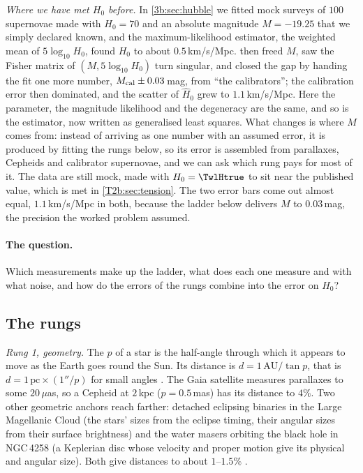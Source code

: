 \emph{Where we have met $H_0$ before.} In \cref{3b:sec:hubble} we fitted mock surveys of $100$ supernovae made with $H_0=70$ and an absolute magnitude $M=-19.25$ that we simply declared known, and the maximum-likelihood estimator, the weighted mean of $5\log_{10}H_0$, found $H_0$ to about $0.5$\,km/s/Mpc.  then freed $M$, saw the Fisher matrix of $(M,5\log_{10}H_0)$ turn singular, and closed the gap by handing the fit one more number, $M_{\rm cal}\pm0.03$\,mag, from ``the calibrators''; the calibration error then dominated, and the scatter of $\hat H_0$ grew to $1.1$\,km/s/Mpc. Here the parameter, the magnitude likelihood and the degeneracy are the same, and so is the estimator, now written as generalised least squares. What changes is where $M$ comes from: instead of arriving as one number with an assumed error, it is produced by fitting the rungs below, so its error is assembled from parallaxes, Cepheids and calibrator supernovae, and we can ask which rung pays for most of it. The data are still mock, made with $H_0=\TwlHtrue$ to sit near the published value, which is met in \cref{T2b:sec:tension}. The two error bars come out almost equal, $1.1$\,km/s/Mpc in both, because the ladder below delivers $M$ to $0.03$\,mag, the precision the worked problem assumed.

\paragraph{The question.} Which measurements make up the ladder, what does each one measure and with what noise, and how do the errors of the rungs combine into the error on $H_0$?

\subsection{The rungs}

\emph{Rung 1, geometry.} The  $p$ of a star is the half-angle through which it appears to move as the Earth goes round the Sun. Its distance is $d=1\,\mathrm{AU}/\tan p$, that is $d=1\,\mathrm{pc}\times(1''/p)$ for small angles \cite[Sec.~8]{Hogg1999}. The Gaia satellite measures parallaxes to some $20\,\mu$as, so a Cepheid at $2$\,kpc ($p=0.5$\,mas) has its distance to $4\%$. Two other geometric anchors reach farther: detached eclipsing binaries in the Large Magellanic Cloud (the stars' sizes from the eclipse timing, their angular sizes from their surface brightness) and the water masers orbiting the black hole in NGC\,4258 (a Keplerian disc whose velocity and proper motion give its physical and angular size). Both give distances to about $1$--$1.5\%$ \cite{Riess2022SH0ES}.

